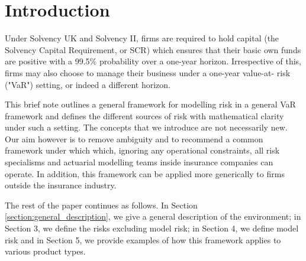 \section{Introduction}

Under Solvency UK and Solvency II, firms are required to hold capital (the
Solvency Capital Requirement, or SCR) which ensures that their basic own funds
are positive with a 99.5\% probability over a one-year horizon. Irrespective of
this, firms may also choose to manage their business under a one-year value-at-
risk ("VaR") setting, or indeed a different horizon.

This brief note outlines a general framework for modelling risk in a general
VaR framework and defines the different sources of risk with mathematical
clarity under such a setting. The concepts that we introduce are not
necessarily new. Our aim however is to remove ambiguity and to recommend a
common framework under which which, ignoring any operational constraints,
all risk specialisms and actuarial modelling teams inside insurance companies
can operate. In addition, this framework can be applied more generically to
firms outside the insurance industry.

The rest of the paper continues as follows. In Section
\ref{section:general_description}, we give a general description of the
environment; in Section 3, we define the risks excluding model risk; in
Section 4, we define model risk and in Section 5, we provide examples of how
this framework applies to various product types.
